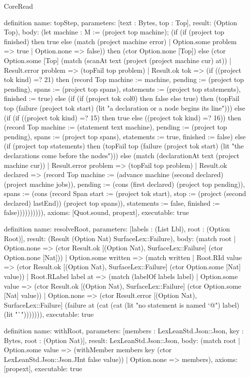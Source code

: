 \begin{lexlean}{CoreRead}
\begin{semanticmodule}
definition{
  name: topStep,
  parameters: [text : Bytes, top : Top],
  result: (Option Top),
  body: (let machine : M := (project top machine); (if (if (project top finished) then true else (match (project machine error)
    | Option.some problem => true
    | Option.none => false)) then (ctor Option.none [Top]) else (ctor Option.some [Top] (match (scanAt text (project (project machine cur) at))
    | Result.error problem => (topFail top problem)
    | Result.ok tok => (if ((project tok kind) =? 21) then (record Top {machine := machine, pending := (project top pending), spans := (project top spans), statements := (project top statements), finished := true}) else (if (if (project tok col0) then false else true) then (topFail top (failure (project tok start) (lit "a declaration or a node begins its line"))) else (if (if ((project tok kind) =? 15) then true else ((project tok kind) =? 16)) then (record Top {machine := (statement text machine), pending := (project top pending), spans := (project top spans), statements := true, finished := false}) else (if (project top statements) then (topFail top (failure (project tok start) (lit "the declarations come before the nodes"))) else (match (declarationAt text (project machine cur))
      | Result.error problem => (topFail top problem)
      | Result.ok declared => (record Top {machine := (advance machine (second declared) (project machine jobs)), pending := (cons (first declared) (project top pending)), spans := (cons (record Span {start := (project tok start), stop := (project (second declared) lastEnd)}) (project top spans)), statements := false, finished := false})))))))))),
  axioms: [Quot.sound, propext],
  executable: true
}

definition{
  name: resolveRoot,
  parameters: [labels : (List Lbl), root : (Option Root)],
  result: (Result (Option Nat) SurfaceLex::Failure),
  body: (match root
    | Option.none => (ctor Result.ok [(Option Nat), SurfaceLex::Failure] (ctor Option.none [Nat]))
    | Option.some written => (match written
      | Root.RId value => (ctor Result.ok [(Option Nat), SurfaceLex::Failure] (ctor Option.some [Nat] value))
      | Root.RLabel label at => (match (labelOf labels label)
        | Option.some value => (ctor Result.ok [(Option Nat), SurfaceLex::Failure] (ctor Option.some [Nat] value))
        | Option.none => (ctor Result.error [(Option Nat), SurfaceLex::Failure] (failure at (cat (cat (lit "no statement is named `@") label) (lit "`"))))))),
  executable: true
}

definition{
  name: withRoot,
  parameters: [members : LexLeanStd.Json::Json, key : Bytes, root : (Option Nat)],
  result: LexLeanStd.Json::Json,
  body: (match root
    | Option.some value => (withMember members key (ctor LexLeanStd.Json::Json.JInt false value))
    | Option.none => members),
  axioms: [propext],
  executable: true
}


\end{semanticmodule}
\end{lexlean}
